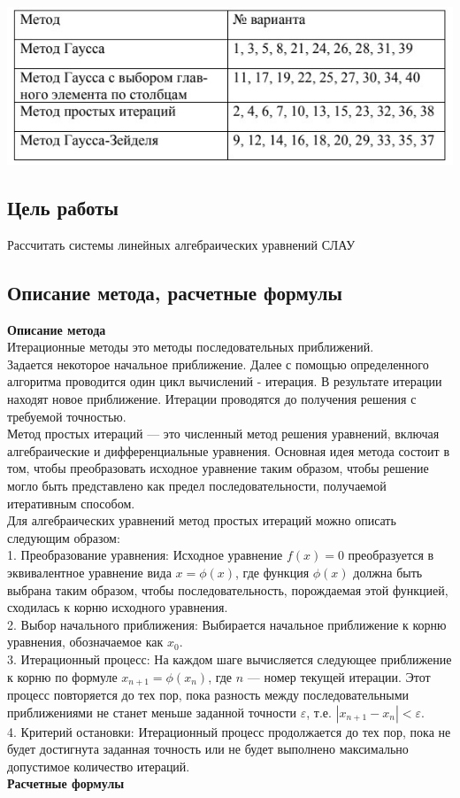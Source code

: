 \documentclass{article}
\begin{document}
\includegraphics{task.jpg}

\subsection{Цель работы}
      Рассчитать системы линейных алгебраических уравнений СЛАУ

\subsection{Описание метода, расчетные формулы}
      \textbf{Описание метода}
      \\
      Итерационные методы это методы последовательных приближений.
      \\
      Задается некоторое начальное приближение. Далее с помощью определенного алгоритма проводится один цикл вычислений - итерация. В результате итерации находят новое приближение. Итерации проводятся до получения решения с требуемой точностью.
      \\
      Метод простых итераций — это численный метод решения уравнений, включая алгебраические и дифференциальные уравнения. Основная идея метода состоит в том, чтобы преобразовать исходное уравнение таким образом, чтобы решение могло быть представлено как предел последовательности, получаемой итеративным способом.
      \\
      Для алгебраических уравнений метод простых итераций можно описать следующим образом:
      \\
      1. Преобразование уравнения: Исходное уравнение \(f(x) = 0\) преобразуется в эквивалентное уравнение вида \(x = \phi(x)\), где функция \(\phi(x)\) должна быть выбрана таким образом, чтобы последовательность, порождаемая этой функцией, сходилась к корню исходного уравнения.
      \\
      2. Выбор начального приближения: Выбирается начальное приближение к корню уравнения, обозначаемое как \(x_0\).
      \\
      3. Итерационный процесс: На каждом шаге вычисляется следующее приближение к корню по формуле \(x_{n+1} = \phi(x_n)\), где \(n\) — номер текущей итерации. Этот процесс повторяется до тех пор, пока разность между последовательными приближениями не станет меньше заданной точности \(\varepsilon\), т.е. \(|x_{n+1} - x_n| < \varepsilon\).
      \\
      4. Критерий остановки: Итерационный процесс продолжается до тех пор, пока не будет достигнута заданная точность или не будет выполнено максимально допустимое количество итераций.
      \\
      \textbf{Расчетные формулы}
\end{document}
